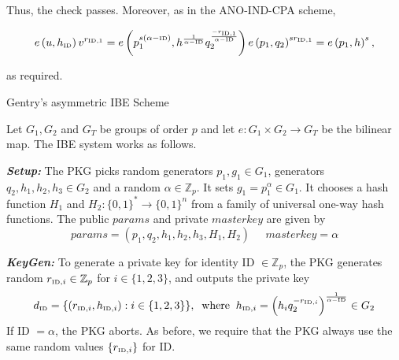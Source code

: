 Thus, the check passes. Moreover, as in the ANO-IND-CPA scheme,

\begin{equation*}
 e \left( u, h_{\textrm{\tiny{ID}}} \right) v^{r_{ \textrm{\tiny{ID}},1}} = e \left( p_1^{s\left( \alpha - \textrm{\tiny{ID}} \right)}, h^{\frac{1}{\alpha - \textrm{\tiny{ID}}}} q_2^{\frac{- r_{\textrm{\tiny{ID}},1}}{\alpha - \textrm{\tiny{ID}}}} \right) e \left( p_1, q_2 \right)^{s r_{\textrm{\tiny{ID}},1}} = e \left( p_1, h\right)^s,
\end{equation*}

as required.

\begin{algorithm}
\caption{Gentry's asymmetric IBE Scheme~\cite{art:Gentry06}}
\label{alg:gentrys_scheme}
Let $G_1 , G_2$ and $G_T$ be groups of order $p$ and let $e : G_1 \times G_2 \rightarrow G_T$ be the bilinear map. The IBE system works as follows.

\begin{description}
\item \textbf{\textit{Setup:}} The PKG picks random generators $p_1, g_1 \in G_1$, generators $q_2, h_1, h_2, h_3 \in G_2$ and a random $\alpha \in \mathbb{Z}_p$. It sets $g_1 = p_1^{\alpha} \in G_1$. It chooses a hash function $H_1$ and $H_2: \{ 0,1 \}^* \rightarrow \{ 0 , 1 \}^n$ from a family of universal one-way hash functions. The public $params$ and private $masterkey$ are given by
\begin{equation*}
 params = \left( p_1,q_2,h_1,h_2,h_3,H_1,H_2\right) \; \; \; \; \; masterkey = \alpha
\end{equation*}

\item \textbf{\textit{KeyGen:}} To generate a private key for identity ID $\in \mathbb{Z}_p$, the PKG generates random $r_{\textrm{\tiny{ID}},i} \in \mathbb{Z}_p$ for $i \in \{1,2,3\}$, and outputs the private key
\begin{equation*}
 d_{\textrm{\tiny{ID}}} = \{ \left( r_{\textrm{\tiny{ID}},i}, h_{\textrm{\tiny{ID}},i} \right) : i \in \{ 1, 2, 3\}\}, \; \; \textrm{where} \; \; h_{\textrm{\tiny{ID}},i} = \left( h_{i}q_2^{-r_{\textrm{\tiny{ID}},i}} \right)^{\frac{1}{\alpha-\textrm{\tiny{ID}}}} \in G_2
\end{equation*}
If ID $ = \alpha $, the PKG aborts. As before, we require that the PKG always use the same random values $\{r_{\textrm{\tiny{ID}},i}\}$ for ID.


\end{description}
\end{algorithm}
